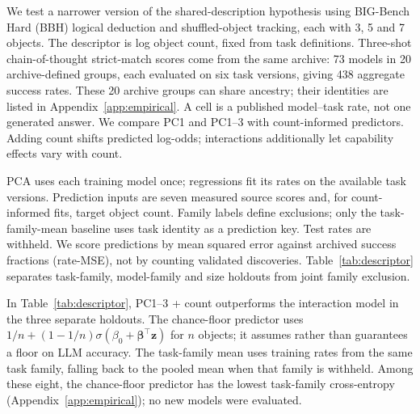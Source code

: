 We test a narrower version of the shared-description hypothesis using BIG-Bench Hard (BBH) logical deduction and shuffled-object tracking, each with 3, 5 and 7 objects. The descriptor is log object count, fixed from task definitions. Three-shot chain-of-thought strict-match scores come from the same archive: 73 models in 20 archive-defined groups, each evaluated on six task versions, giving 438 aggregate success rates. These 20 archive groups can share ancestry; their identities are listed in Appendix~\ref{app:empirical}. A cell is a published model--task rate, not one generated answer. We compare PC1 and PC1--3 with count-informed predictors. Adding count shifts predicted log-odds; interactions additionally let capability effects vary with count.

PCA uses each training model once; regressions fit its rates on the available task versions. Prediction inputs are seven measured source scores and, for count-informed fits, target object count. Family labels define exclusions; only the task-family-mean baseline uses task identity as a prediction key. Test rates are withheld. We score predictions by mean squared error against archived success fractions (rate-MSE), not by counting validated discoveries. Table~\ref{tab:descriptor} separates task-family, model-family and size holdouts from joint family exclusion.

\begin{table}[htbp]
\centering\small
\caption{Archived rate-MSE; lower is better. Separate holdouts exclude a task family (438 cells), model family (438), or size 7 (146; training at 3/5). Joint holdout excludes both families (438 cells); Cells weights cells equally, Families weights the 20 model groups equally. Each split uses identical cells across predictors. $\dagger$ marks post-result rivals; the joint test is also post-result. These are retrospective, not contamination-controlled tests.}
\label{tab:descriptor}

\end{table}

In Table~\ref{tab:descriptor}, PC1--3 + count outperforms the interaction model in the three separate holdouts. The chance-floor predictor uses $1/n+(1-1/n)\sigma(\beta_0+\boldsymbol\beta^\top\mathbf z)$ for $n$ objects; it assumes rather than guarantees a floor on LLM accuracy. The task-family mean uses training rates from the same task family, falling back to the pooled mean when that family is withheld. Among these eight, the chance-floor predictor has the lowest task-family cross-entropy (Appendix~\ref{app:empirical}); no new models were evaluated.


